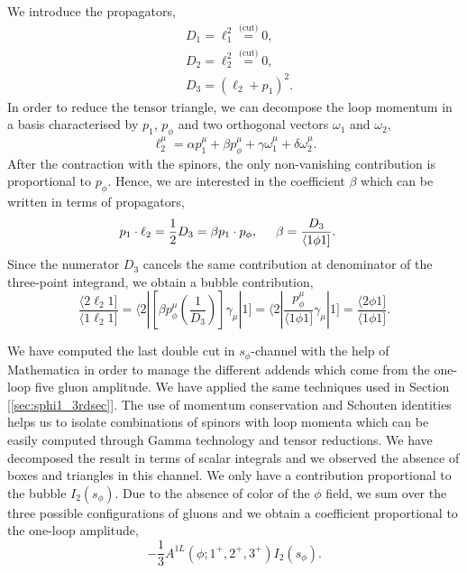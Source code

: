 We introduce the propagators,
\begin{align*}
	&D_1=\ell_1^2 \overset{\text{(cut)}}{=} 0,\\
	&D_2=\ell_2^2 \overset{\text{(cut)}}{=} 0,\\
	&D_3=(\ell_2+p_1)^2.
\end{align*}
In order to reduce the tensor triangle, we can decompose the loop momentum in a basis characterised by $p_1$, $p_\phi$ and two orthogonal vectors $\omega_1$ and $\omega_2$,
$$
	\ell_2^\mu=\alpha p_1^\mu + \beta p_\phi^\mu + \gamma \omega_1^\mu + \delta \omega_2^\mu.
$$
After the contraction with the spinors, the only non-vanishing contribution is proportional to $p_\phi$. Hence, we are interested in the coefficient $\beta$ which can be written in terms of propagators,
\begin{align*}
	&p_1 \cdot \ell_2=  \frac{1}{2} D_3 = \beta p_1 \cdot p_\phi, \hspace{0.5cm}\beta=\frac{D_3}{\langle 1 \phi 1]}.
\end{align*}
Since the numerator $D_3$ cancels the same contribution at denominator of the three-point integrand, we obtain a bubble contribution,
$$
	\frac{\langle 2 \ell_2 1 ]}{\langle 1 \ell_2 1]}=\langle 2| \left[ \beta p_\phi^\mu \left(
	\frac{1}{D_3} \right) \right]\gamma_\mu |1] = \langle 2 | \frac{p_\phi^\mu}{\langle 1 \phi 1]} \gamma_\mu |1]=\frac{\langle 2 \phi 1]}{\langle 1 \phi 1]}.
$$

We have computed the last double cut in $s_\phi$-channel with the help of Mathematica in order to manage the different addends which come from the one-loop five gluon amplitude. We have applied the same techniques used in Section [\ref{sec:sphi1_3rdsec}]. The use of momentum conservation and Schouten identities helps us to isolate combinations of spinors with loop momenta which can be easily computed through Gamma technology and tensor reductions. We have decomposed the result in terms of scalar integrals and we observed the absence of boxes and triangles in this channel. We only have a contribution proportional to the bubble $I_2(s_\phi)$.
Due to the absence of color of the $\phi$ field, we sum over the three possible configurations of gluons and we obtain a coefficient proportional to the one-loop amplitude,
$$
	-\frac{1}{3} A^{1L}(\phi;1^+,2^+,3^+) I_2(s_\phi).
$$